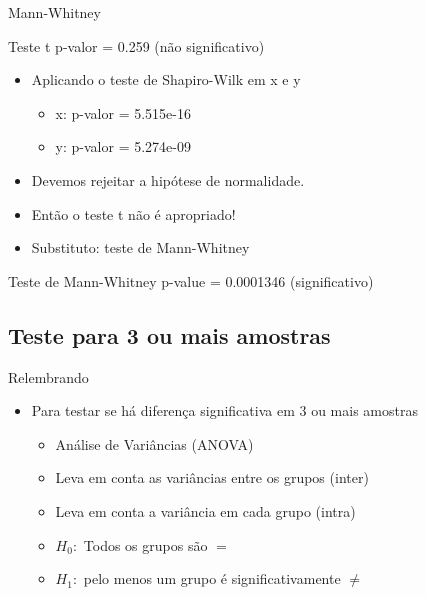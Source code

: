 \documentclass{beamer}
\begin{document}
\begin{frame}{Mann-Whitney}
  \begin{exampleblock}{Teste t}
    p-valor = 0.259 (não significativo)
  \end{exampleblock}
  \begin{itemize}
  \item<2-> Aplicando o teste de Shapiro-Wilk em x e y
    \begin{itemize}
    \item<2-> x: p-valor = 5.515e-16
    \item<2-> y: p-valor = 5.274e-09
    \end{itemize}
  \item Devemos rejeitar a hipótese de normalidade.
  \item Então o teste t \alert{não é} apropriado!
  \item Substituto: teste de Mann-Whitney
  \end{itemize}
  \begin{exampleblock}{Teste de Mann-Whitney}
    p-value = \alert{0.0001346} (significativo)
  \end{exampleblock}
\end{frame}

\subsection[3+ amostras]{Teste para 3 ou mais amostras}

\begin{frame}{Relembrando}
  \begin{itemize}
  \item Para testar se há diferença significativa em 3 ou mais amostras
    \begin{itemize}
    \item Análise de Variâncias (ANOVA)
    \item Leva em conta as variâncias entre os grupos (\alert{inter})
    \item Leva em conta a variância em cada grupo (\alert{intra})
    \item $H_0:$ Todos os grupos são $=$
    \item $H_1:$ pelo menos um grupo é significativamente $\ne$
    \end{itemize}
  \end{itemize}
\end{frame}
\end{document}
